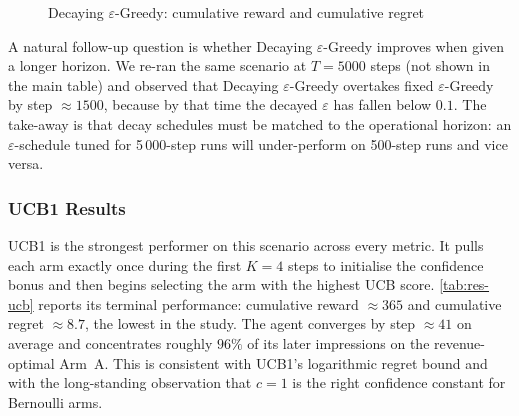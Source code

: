 \begin{figure}[H]
\centering
{}
\caption{Decaying $\varepsilon$-Greedy: cumulative reward and cumulative regret}
\label{fig:egd-curves}
\end{figure}

A natural follow-up question is whether Decaying $\varepsilon$-Greedy improves when given a longer horizon. We re-ran the same scenario at $T = 5000$ steps (not shown in the main table) and observed that Decaying $\varepsilon$-Greedy overtakes fixed $\varepsilon$-Greedy by step $\approx 1500$, because by that time the decayed $\varepsilon$ has fallen below $0.1$. The take-away is that decay schedules must be matched to the operational horizon: an $\varepsilon$-schedule tuned for 5\,000-step runs will under-perform on 500-step runs and vice versa.

\subsubsection{UCB1 Results}
UCB1 is the strongest performer on this scenario across every metric. It pulls each arm exactly once during the first $K=4$ steps to initialise the confidence bonus and then begins selecting the arm with the highest UCB score. \cref{tab:res-ucb} reports its terminal performance: cumulative reward $\approx 365$ and cumulative regret $\approx 8.7$, the lowest in the study. The agent converges by step $\approx 41$ on average and concentrates roughly $96\%$ of its later impressions on the revenue-optimal Arm~A. This is consistent with UCB1's logarithmic regret bound and with the long-standing observation that $c = 1$ is the right confidence constant for Bernoulli arms.

